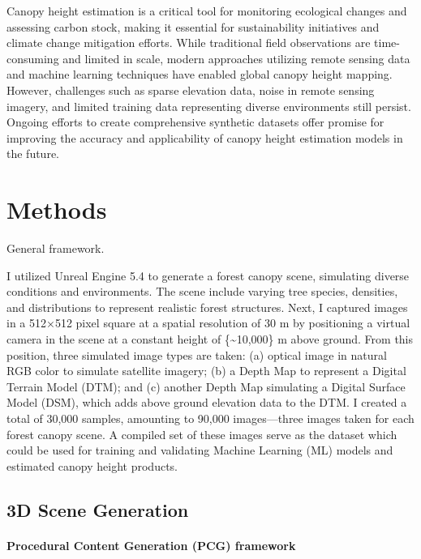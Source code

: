 \documentclass[12pt, man, dvipsnames, floatsintext]{apa7}
\begin{document}
Canopy height estimation is a critical tool for monitoring ecological
changes and assessing carbon stock, making it essential for
sustainability initiatives and climate change mitigation efforts. While
traditional field observations are time-consuming and limited in scale,
modern approaches utilizing remote sensing data and machine learning
techniques have enabled global canopy height mapping. However,
challenges such as sparse elevation data, noise in remote sensing
imagery, and limited training data representing diverse environments
still persist. Ongoing efforts to create comprehensive synthetic
datasets offer promise for improving the accuracy and applicability of
canopy height estimation models in the future.

\hypertarget{methods}{%
\section{Methods}\label{methods}}

General framework.

I utilized Unreal Engine 5.4 to generate a forest canopy scene,
simulating diverse conditions and environments. The scene include
varying tree species, densities, and distributions to represent
realistic forest structures. Next, I captured images in a 512×512 pixel
square at a spatial resolution of 30 m by positioning a virtual camera
in the scene at a constant height of \{\textasciitilde10,000\} m above
ground. From this position, three simulated image types are taken: (a)
optical image in natural RGB color to simulate satellite imagery; (b) a
Depth Map to represent a Digital Terrain Model (DTM); and (c) another
Depth Map simulating a Digital Surface Model (DSM), which adds above
ground elevation data to the DTM. I created a total of 30,000 samples,
amounting to 90,000 images---three images taken for each forest canopy
scene. A compiled set of these images serve as the dataset which could
be used for training and validating Machine Learning (ML) models and
estimated canopy height products.

\hypertarget{d-scene-generation}{%
\subsection{3D Scene Generation}\label{d-scene-generation}}

\hypertarget{procedural-content-generation-pcg-framework}{%
\paragraph{Procedural Content Generation (PCG)
framework}\label{procedural-content-generation-pcg-framework}}
\end{document}
